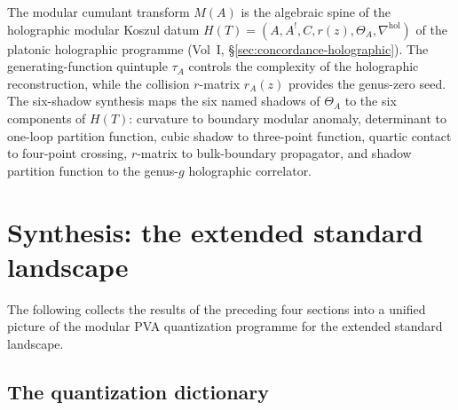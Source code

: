 \begin{remark}
The modular cumulant transform $M(A)$ is the algebraic spine of the
holographic modular Koszul datum
$H(T) = (A, A^!, C, r(z), \Theta_A, \nabla^{\mathrm{hol}})$
of the platonic holographic programme
(Vol~I, \S\ref*{sec:concordance-holographic}).
The generating-function quintuple $\tau_A$ controls the complexity of
the holographic reconstruction, while the collision $r$-matrix $r_A(z)$
provides the genus-zero seed. The six-shadow synthesis maps
the six named shadows of $\Theta_A$ to the six components of $H(T)$:
curvature to boundary modular anomaly, determinant to one-loop partition
function, cubic shadow to three-point function, quartic contact to
four-point crossing, $r$-matrix to bulk-boundary propagator, and shadow
partition function to the genus-$g$ holographic correlator.
\end{remark}

\section{Synthesis: the extended standard landscape}

The following collects the results of the preceding four sections into a
unified picture of the modular PVA quantization programme for the
extended standard landscape.

\subsection{The quantization dictionary}

